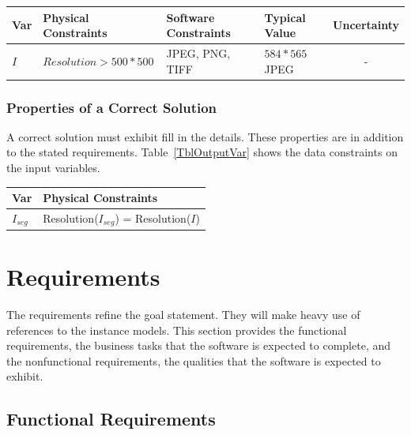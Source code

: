 \documentclass[12pt]{article}
\begin{document}
\begin{table}[!h]
  \caption{Input Variables} \label{TblInputVar}
  \renewcommand{\arraystretch}{1.2}
\noindent \begin{longtable*}{l l l l c} 
  \toprule
  \textbf{Var} & \textbf{Physical Constraints} & \textbf{Software Constraints} &
                             \textbf{Typical Value} & \textbf{Uncertainty}\\
  \midrule 

  $I$ & $Resolution>500*500$ & JPEG, PNG, TIFF & $584*565$ JPEG & -
  \\
  \bottomrule
\end{longtable*}
\end{table}

\subsubsection{Properties of a Correct Solution} \label{sec_CorrectSolution}

\noindent
A correct solution must exhibit fill in the details. These properties are in addition to the stated requirements.  Table~\ref{TblOutputVar} shows the data constraints on the input variables. 

\begin{table}[!h]
\caption{Output Variables} \label{TblOutputVar}
\renewcommand{\arraystretch}{1.2}
\noindent \begin{longtable*}{l l} 
  \toprule
  \textbf{Var} & \textbf{Physical Constraints} \\
  \midrule 
  $I_{seg}$ & Resolution($I_{seg}$) = Resolution($I$)
  \\
  \bottomrule
\end{longtable*}
\end{table}

\section{Requirements}

The requirements refine the goal statement.  They will make heavy use of references to the instance models. This section provides the functional requirements, the business tasks that the software is expected to complete, and the nonfunctional requirements, the qualities that the software is expected to exhibit.

\subsection{Functional Requirements}
\end{document}
